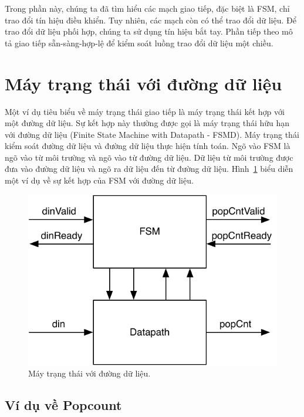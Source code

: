 \documentclass[%
    10pt,
    headinclude, footexclude,
    openright, %
    notitlepage,
    cleardoubleempty,
    headsepline,
    pointlessnumbers,
    bibtotoc, idxtotoc,
    ]{scrbook}
\newcommand{\scale}{0.7}
\begin{document}
Trong phần này, chúng ta đã tìm hiểu các mạch giao tiếp, đặc biệt là FSM, chỉ trao đổi tín hiệu điều khiển. Tuy nhiên, các mạch còn có thể trao đổi dữ liệu. Để trao đổi dữ liệu phối hợp, chúng ta sử dụng tín hiệu bắt tay. Phần tiếp theo mô tả giao tiếp sẵn-sàng-hợp-lệ để kiểm soát luồng trao đổi dữ liệu một chiều. 

\section{Máy trạng thái với đường dữ liệu}

Một ví dụ tiêu biểu về máy trạng thái giao tiếp là máy trạng thái kết hợp với một đường dữ liệu. Sự kết hợp này thường được gọi là máy trạng thái hữu hạn với đường dữ liệu (Finite State Machine with Datapath - FSMD). Máy trạng thái kiểm soát đường dữ liệu và đường dữ liệu thực hiện tính toán. Ngõ vào FSM là ngõ vào từ môi trường và ngõ vào từ đường dữ liệu. Dữ liệu từ môi trường được đưa vào đường dữ liệu và ngõ ra dữ liệu đến từ đường dữ liệu. Hình~\ref{fig:popcnt-fsmd} biểu diễn một ví dụ về sự kết hợp của FSM với đường dữ liệu. 

\begin{figure}
  \centering
  \includegraphics[scale=\scale]{figures/popcnt-fsmd}
  \caption{Máy trạng thái với đường dữ liệu.}
  \label{fig:popcnt-fsmd}
\end{figure}

\subsection{Ví dụ về Popcount}
\end{document}
